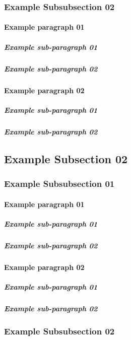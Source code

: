 		\subsubsection{Example Subsubsection 02}
			\paragraph{Example paragraph 01}
				\subparagraph{Example sub-paragraph 01}
				\subparagraph{Example sub-paragraph 02}
			\paragraph{Example paragraph 02}
				\subparagraph{Example sub-paragraph 01}
				\subparagraph{Example sub-paragraph 02}
	\subsection{Example Subsection 02}
		\subsubsection{Example Subsubsection 01}
			\paragraph{Example paragraph 01}
				\subparagraph{Example sub-paragraph 01}
				\subparagraph{Example sub-paragraph 02}
			\paragraph{Example paragraph 02}
				\subparagraph{Example sub-paragraph 01}
				\subparagraph{Example sub-paragraph 02}
		\subsubsection{Example Subsubsection 02}

